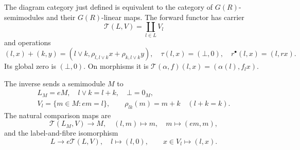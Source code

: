 \begin{theorem}
The diagram category just defined is equivalent to the category of
\(G(R)\)-semimodules and their \(G(R)\)-linear maps. The forward
functor has carrier
\[
 \mathcal T(L,V)=\coprod_{l\in L}V_l
\]
and operations
\[
 (l,x)+(k,y)=
 (l\vee k,\rho_{l,l\vee k}x+\rho_{k,l\vee k}y),\quad
 \tau(l,x)=(\bot,0),\quad r^\bullet(l,x)=(l,rx).
 \tag{D2}
\]
Its global zero is \((\bot,0)\). On morphisms it is
\(\mathcal T(\alpha,f)(l,x)=(\alpha(l),f_lx)\).

The inverse sends a semimodule \(M\) to
\[
 \begin{gathered}
 L_M=eM,\quad l\vee k=l+k,\quad \bot=0_M,\\
 V_l=\{m\in M:em=l\},\qquad
 \rho_{lk}(m)=m+k\quad(l+k=k).
 \end{gathered}
 \tag{D3}
\]
The natural comparison maps are
\[
 \mathcal T(L_M,V)\longrightarrow M,\quad(l,m)\mapsto m,
 \quad m\mapsto(em,m),
 \tag{D4}
\]
and the label-and-fibre isomorphism
\[
 L\longrightarrow e\mathcal T(L,V),\quad l\mapsto(l,0),
 \qquad x\in V_l\longmapsto(l,x).
 \tag{D5}
\]
\end{theorem}

